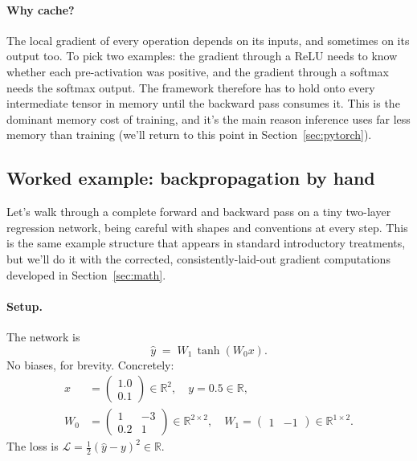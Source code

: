 \documentclass[11pt, a4paper]{article}
\newcommand{\R}{\mathbb{R}}
\newcommand{\Loss}{\mathcal{L}}
\begin{document}
\paragraph{Why cache?} The local gradient of every operation depends on its inputs, and sometimes on its output too. To pick two examples: the gradient through a ReLU needs to know whether each pre-activation was positive, and the gradient through a softmax needs the softmax output. The framework therefore has to hold onto every intermediate tensor in memory until the backward pass consumes it. This is the dominant memory cost of training, and it's the main reason inference uses far less memory than training (we'll return to this point in Section~\ref{sec:pytorch}).

\subsection{Worked example: backpropagation by hand}

Let's walk through a complete forward and backward pass on a tiny two-layer regression network, being careful with shapes and conventions at every step. This is the same example structure that appears in standard introductory treatments, but we'll do it with the corrected, consistently-laid-out gradient computations developed in Section~\ref{sec:math}.

\paragraph{Setup.} The network is
\[
    \hat y \;=\; W_1\,\tanh(W_0 x).
\]
No biases, for brevity. Concretely:
\begin{align*}
    x &= \begin{pmatrix} 1.0 \\ 0.1 \end{pmatrix} \in \R^2, \quad y = 0.5 \in \R, \\
    W_0 &= \begin{pmatrix} 1 & -3 \\ 0.2 & 1 \end{pmatrix} \in \R^{2 \times 2}, \quad
    W_1 = \begin{pmatrix} 1 & -1 \end{pmatrix} \in \R^{1 \times 2}.
\end{align*}
The loss is $\Loss = \tfrac{1}{2}(\hat y - y)^2 \in \R$.
\end{document}
